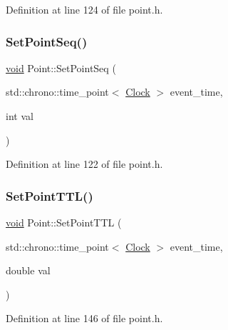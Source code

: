 Definition at line 124 of file point.\+h.

\mbox{\label{class_point_a912aefb007184f73b86c37257a415237}} 
\subsubsection{\texorpdfstring{Set\+Point\+Seq()}{SetPointSeq()}}
{\footnotesize\ttfamily \mbox{\hyperlink{glad_8h_a950fc91edb4504f62f1c577bf4727c29}{void}} Point\+::\+Set\+Point\+Seq (\begin{DoxyParamCaption}\item[{std\+::chrono\+::time\+\_\+point$<$ \mbox{\hyperlink{universe_8h_a0ef8d951d1ca5ab3cfaf7ab4c7a6fd80}{Clock}} $>$}]{event\+\_\+time,  }\item[{int}]{val }\end{DoxyParamCaption})\hspace{0.3cm}{\ttfamily [inline]}}



Definition at line 122 of file point.\+h.

\mbox{\label{class_point_a60ccff89b647d069146a596b8c43d123}} 
\subsubsection{\texorpdfstring{Set\+Point\+T\+T\+L()}{SetPointTTL()}}
{\footnotesize\ttfamily \mbox{\hyperlink{glad_8h_a950fc91edb4504f62f1c577bf4727c29}{void}} Point\+::\+Set\+Point\+T\+TL (\begin{DoxyParamCaption}\item[{std\+::chrono\+::time\+\_\+point$<$ \mbox{\hyperlink{universe_8h_a0ef8d951d1ca5ab3cfaf7ab4c7a6fd80}{Clock}} $>$}]{event\+\_\+time,  }\item[{double}]{val }\end{DoxyParamCaption})\hspace{0.3cm}{\ttfamily [inline]}}



Definition at line 146 of file point.\+h.

\mbox{\label{class_point_a1227b110f1fa0aab599f9374ea5ec484}} 
